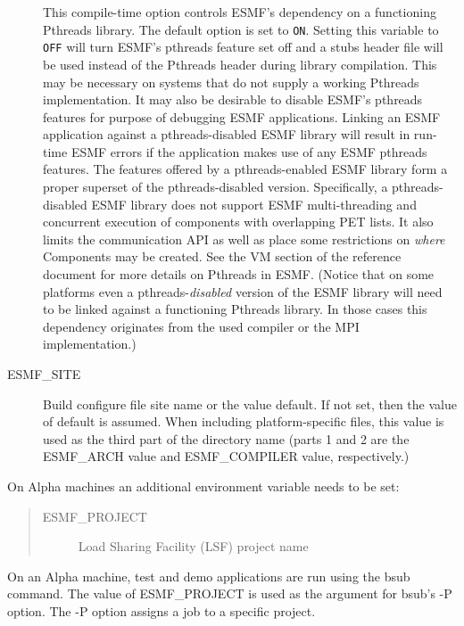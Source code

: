 \begin{description}
This compile-time option controls ESMF's dependency on a functioning
Pthreads library. The default option is set to {\tt ON}. Setting this
variable to {\tt OFF} will turn ESMF's pthreads feature set off and a
stubs header file will be used instead of the Pthreads header during
library compilation. This may be necessary on systems that do not
supply a working Pthreads implementation. It may also be desirable to
disable ESMF's pthreads features for purpose of debugging ESMF
applications. Linking an ESMF application against a pthreads-disabled
ESMF library will result in run-time ESMF errors if the application
makes use of any ESMF pthreads features. The features offered by a
pthreads-enabled ESMF library form a proper superset of the
pthreads-disabled version. Specifically, a pthreads-disabled ESMF
library does not support ESMF multi-threading and concurrent execution
of components with overlapping PET lists. It also limits the
communication API as well as place some restrictions on {\em where}
Components may be created. See the VM section of the reference
document for more details on Pthreads in ESMF. (Notice that on some
platforms even a pthreads-{\em disabled} version of the ESMF library
will need to be linked against a functioning Pthreads library. In
those cases this dependency originates from the used compiler or the
MPI implementation.)

\item[ESMF\_SITE] 
Build configure file site name or the value default.  
If not set, then the value of default is assumed.
When including platform-specific files, this value is used as the
third part of the directory name (parts 1 and 2 are the
ESMF\_ARCH value and ESMF\_COMPILER value, respectively.)

\end{description}

On Alpha machines an additional environment variable needs
to be set:

\begin{quote}
\begin{description}
  \item[ESMF\_PROJECT] Load Sharing Facility (LSF) project name
\end{description}
\end{quote}

On an Alpha machine, test and demo applications are run using 
the bsub command.  The value of ESMF\_PROJECT is used as the 
argument for bsub's -P option. The -P option assigns a job to 
a specific project.  


